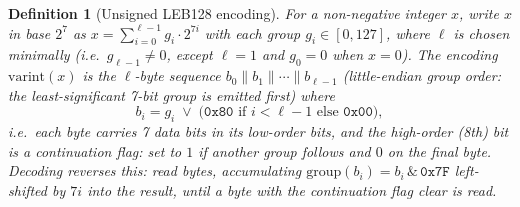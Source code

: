 \documentclass[11pt,a4paper]{article}
\newtheorem{definition}[theorem]{Definition}
\begin{document}
\begin{definition}[Unsigned LEB128 encoding]
\label{def:leb128}
For a non-negative integer $x$, write $x$ in base $2^7$ as
$x = \sum_{i=0}^{\ell-1} g_i \cdot 2^{7i}$ with each \emph{group}
$g_i \in [0, 127]$, where $\ell$ is chosen minimally (i.e.\ $g_{\ell-1} \neq 0$,
except $\ell = 1$ and $g_0 = 0$ when $x = 0$). The encoding
$\mathrm{varint}(x)$ is the $\ell$-byte sequence $b_0 \| b_1 \| \cdots \|
b_{\ell-1}$ (\emph{little-endian group order}: the least-significant
7-bit group is emitted first) where
\[
  b_i = g_i \;\lor\; \bigl(\texttt{0x80} \text{ if } i < \ell-1 \text{ else } \texttt{0x00}\bigr),
\]
i.e.\ each byte carries 7 data bits in its low-order bits, and the
high-order (8th) bit is a \emph{continuation flag}: set to $1$ if another
group follows and $0$ on the final byte. Decoding reverses this: read
bytes, accumulating $\mathrm{group}(b_i) = b_i \,\&\, \texttt{0x7F}$
left-shifted by $7i$ into the result, until a byte with the continuation
flag clear is read.


\end{definition}
\end{document}
